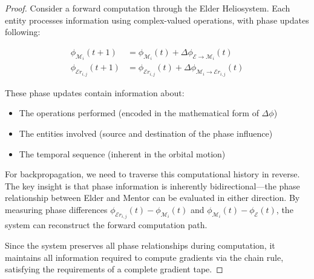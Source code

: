 \begin{proof}
Consider a forward computation through the Elder Heliosystem. Each entity processes information using complex-valued operations, with phase updates following:

\begin{align}
\phi_{\mathcal{M}_i}(t+1) &= \phi_{\mathcal{M}_i}(t) + \Delta\phi_{\mathcal{E} \rightarrow \mathcal{M}_i}(t) \\
\phi_{\mathcal{E}r_{i,j}}(t+1) &= \phi_{\mathcal{E}r_{i,j}}(t) + \Delta\phi_{\mathcal{M}_i \rightarrow \mathcal{E}r_{i,j}}(t)
\end{align}

These phase updates contain information about:
\begin{itemize}
    \item The operations performed (encoded in the mathematical form of $\Delta\phi$)
    \item The entities involved (source and destination of the phase influence)
    \item The temporal sequence (inherent in the orbital motion)
\end{itemize}

For backpropagation, we need to traverse this computational history in reverse. The key insight is that phase information is inherently bidirectional—the phase relationship between Elder and Mentor can be evaluated in either direction. By measuring phase differences $\phi_{\mathcal{E}r_{i,j}}(t) - \phi_{\mathcal{M}_i}(t)$ and $\phi_{\mathcal{M}_i}(t) - \phi_{\mathcal{E}}(t)$, the system can reconstruct the forward computation path.

Since the system preserves all phase relationships during computation, it maintains all information required to compute gradients via the chain rule, satisfying the requirements of a complete gradient tape.
\end{proof}

